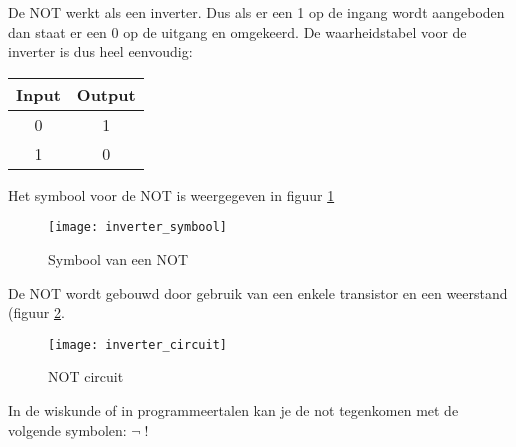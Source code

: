 De NOT werkt als een inverter. Dus als er een 1 op de ingang wordt aangeboden dan staat er een 0 op de uitgang en omgekeerd. De waarheidstabel voor de inverter is dus heel eenvoudig:

\begin{tabular}{ |c|c| }
\hline
\rowcolor{gray!60}
Input & Output \\
\hline
0 & 1 \\
\hline
1 & 0 \\
\hline
\end{tabular}


Het symbool voor de NOT is weergegeven in figuur \ref{symbool:not}

\begin{figure}[h]
\texttt{[image: inverter\_symbool]}
\centering
\caption{Symbool van een NOT}
\label{symbool:not}
\end{figure}

De NOT wordt gebouwd door gebruik van een enkele transistor en een weerstand (figuur \ref{circuit:not}.

\begin{figure}[h]
\texttt{[image: inverter\_circuit]}
\centering
\caption{NOT circuit}
\label{circuit:not}
\end{figure}

In de wiskunde of in programmeertalen kan je de not tegenkomen met de volgende symbolen:
\begin{math}
\lnot \; !
\end{math}

